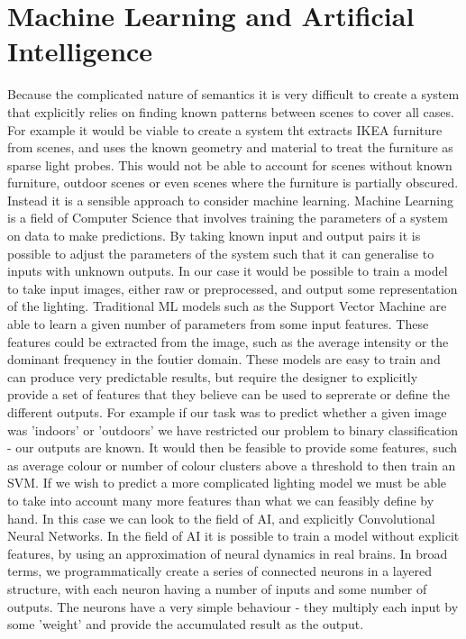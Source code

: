 \documentclass[ %
                    author={Gavin Parker},
                supervisor={Dr. Neill Campbell},
                    degree={MEng},
                     title={Deep Siamese Networks for Illumination Estimation from Stereo Images},
                  subtitle={},
                      type={research},
                      year={2018} ]{dissertation}
\begin{document}
\section{Machine Learning and Artificial Intelligence}
Because the complicated nature of semantics it is very difficult to create a system that explicitly relies on finding known patterns between scenes to cover all cases. For example it would be viable to create a system tht extracts IKEA furniture from scenes, and uses the known geometry and material to treat the furniture as sparse light probes. This would not be able to account for scenes without known furniture, outdoor scenes or even scenes where the furniture is partially obscured. Instead it is a sensible approach to consider machine learning. Machine Learning is a field of Computer Science that involves training the parameters of a system on data to make predictions. By taking known input and output pairs it is possible to adjust the parameters of the system such that it can generalise to inputs with unknown outputs. In our case it would be possible to train a model to take input images, either raw or preprocessed, and output some representation of the lighting. Traditional ML models such as the Support Vector Machine are able to learn a given number of parameters from some input features. These features could be extracted from the image, such as the average intensity or the dominant frequency in the foutier domain. These models are easy to train and can produce very predictable results, but require the designer to explicitly provide a set of features that they believe can be used to seprerate or define the different outputs. For example if our task was to predict whether a given image was 'indoors' or 'outdoors' we have restricted our problem to binary classification - our outputs are known. It would then be feasible to provide some features, such as average colour or number of colour clusters above a threshold to then train an SVM.
\newline
If we wish to predict a more complicated lighting model we must be able to take into account many more features than what we can feasibly define by hand. In this case we can look to the field of AI, and explicitly Convolutional Neural Networks. In the field of AI it is possible to train a model without explicit features, by using an approximation of neural dynamics in real brains. In broad terms, we programmatically create a series of connected neurons in a layered structure, with each neuron having a number of inputs and some number of outputs. The neurons have a very simple behaviour - they multiply each input by some 'weight' and provide the accumulated result as the output.
\end{document}

